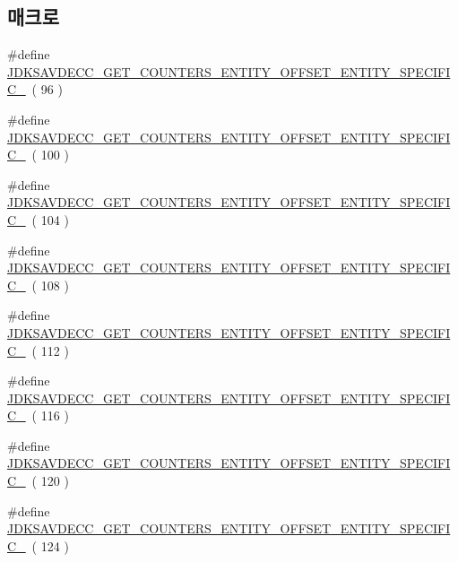 \subsection*{매크로}
\begin{DoxyCompactItemize}
\item 
\#define \hyperlink{group__get__counters__entity_ga795899145b1d9b0c32cac81f2f8514d6}{J\+D\+K\+S\+A\+V\+D\+E\+C\+C\+\_\+\+G\+E\+T\+\_\+\+C\+O\+U\+N\+T\+E\+R\+S\+\_\+\+E\+N\+T\+I\+T\+Y\+\_\+\+O\+F\+F\+S\+E\+T\+\_\+\+E\+N\+T\+I\+T\+Y\+\_\+\+S\+P\+E\+C\+I\+F\+I\+C\+\_}~( 96 )
\item 
\#define \hyperlink{group__get__counters__entity_gad502701896d273398d306abcf131f0d2}{J\+D\+K\+S\+A\+V\+D\+E\+C\+C\+\_\+\+G\+E\+T\+\_\+\+C\+O\+U\+N\+T\+E\+R\+S\+\_\+\+E\+N\+T\+I\+T\+Y\+\_\+\+O\+F\+F\+S\+E\+T\+\_\+\+E\+N\+T\+I\+T\+Y\+\_\+\+S\+P\+E\+C\+I\+F\+I\+C\+\_}~( 100 )
\item 
\#define \hyperlink{group__get__counters__entity_ga17c92a4044dc7a51523fe15a615edba1}{J\+D\+K\+S\+A\+V\+D\+E\+C\+C\+\_\+\+G\+E\+T\+\_\+\+C\+O\+U\+N\+T\+E\+R\+S\+\_\+\+E\+N\+T\+I\+T\+Y\+\_\+\+O\+F\+F\+S\+E\+T\+\_\+\+E\+N\+T\+I\+T\+Y\+\_\+\+S\+P\+E\+C\+I\+F\+I\+C\+\_}~( 104 )
\item 
\#define \hyperlink{group__get__counters__entity_ga97606c3e37efbffb182408c18b779ab6}{J\+D\+K\+S\+A\+V\+D\+E\+C\+C\+\_\+\+G\+E\+T\+\_\+\+C\+O\+U\+N\+T\+E\+R\+S\+\_\+\+E\+N\+T\+I\+T\+Y\+\_\+\+O\+F\+F\+S\+E\+T\+\_\+\+E\+N\+T\+I\+T\+Y\+\_\+\+S\+P\+E\+C\+I\+F\+I\+C\+\_}~( 108 )
\item 
\#define \hyperlink{group__get__counters__entity_gacefc9d423bd5cdbbe3d7b555cca28a7a}{J\+D\+K\+S\+A\+V\+D\+E\+C\+C\+\_\+\+G\+E\+T\+\_\+\+C\+O\+U\+N\+T\+E\+R\+S\+\_\+\+E\+N\+T\+I\+T\+Y\+\_\+\+O\+F\+F\+S\+E\+T\+\_\+\+E\+N\+T\+I\+T\+Y\+\_\+\+S\+P\+E\+C\+I\+F\+I\+C\+\_}~( 112 )
\item 
\#define \hyperlink{group__get__counters__entity_ga903771c6d9498138641ac8a8f922205b}{J\+D\+K\+S\+A\+V\+D\+E\+C\+C\+\_\+\+G\+E\+T\+\_\+\+C\+O\+U\+N\+T\+E\+R\+S\+\_\+\+E\+N\+T\+I\+T\+Y\+\_\+\+O\+F\+F\+S\+E\+T\+\_\+\+E\+N\+T\+I\+T\+Y\+\_\+\+S\+P\+E\+C\+I\+F\+I\+C\+\_}~( 116 )
\item 
\#define \hyperlink{group__get__counters__entity_gae57a4eb419810d326234bc3404669ca4}{J\+D\+K\+S\+A\+V\+D\+E\+C\+C\+\_\+\+G\+E\+T\+\_\+\+C\+O\+U\+N\+T\+E\+R\+S\+\_\+\+E\+N\+T\+I\+T\+Y\+\_\+\+O\+F\+F\+S\+E\+T\+\_\+\+E\+N\+T\+I\+T\+Y\+\_\+\+S\+P\+E\+C\+I\+F\+I\+C\+\_}~( 120 )
\item 
\#define \hyperlink{group__get__counters__entity_ga6b6f8c1fc1d55a6adb953935a2ad2d4c}{J\+D\+K\+S\+A\+V\+D\+E\+C\+C\+\_\+\+G\+E\+T\+\_\+\+C\+O\+U\+N\+T\+E\+R\+S\+\_\+\+E\+N\+T\+I\+T\+Y\+\_\+\+O\+F\+F\+S\+E\+T\+\_\+\+E\+N\+T\+I\+T\+Y\+\_\+\+S\+P\+E\+C\+I\+F\+I\+C\+\_}~( 124 )
\end{DoxyCompactItemize}


